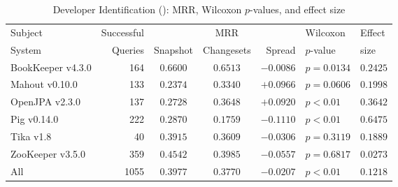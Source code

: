 \begin{table}[t]
\centering
\caption{Developer Identification (\done): MRR, Wilcoxon $p$-values, and effect size}
\begin{tabular}{l|r|ccr|ll}
\toprule
Subject & Successful &    & MRR &        & Wilcoxon  & Effect \\
System  & Queries    & Snapshot & Changesets  & Spread & $p$-value & size \\
\midrule
BookKeeper v4.3.0 & 164 & $\bm{0.6600}$ & $0.6513$ & $-0.0086$ & $p = 0.0134$ & $0.2425$ \\
Mahout v0.10.0 & 133 & $0.2374$ & $\bm{0.3340}$ & $+0.0966$ & $p = 0.0606$ & $0.1998$ \\
OpenJPA v2.3.0 & 137 & $0.2728$ & $\bm{0.3648}$ & $+0.0920$ & $p < 0.01$ & $0.3642$ \\
Pig v0.14.0 & 222 & $\bm{0.2870}$ & $0.1759$ & $-0.1110$ & $p < 0.01$ & $0.6475$ \\
Tika v1.8 & 40 & $\bm{0.3915}$ & $0.3609$ & $-0.0306$ & $p = 0.3119$ & $0.1889$ \\
ZooKeeper v3.5.0 & 359 & $\bm{0.4542}$ & $0.3985$ & $-0.0557$ & $p = 0.6817$ & $0.0273$ \\
\midrule
All & 1055 & $\bm{0.3977}$ & $0.3770$ & $-0.0207$ & $p < 0.01$ & $0.1218$ \\
\bottomrule
\end{tabular}
\label{table:triage_rq1}
\end{table}
